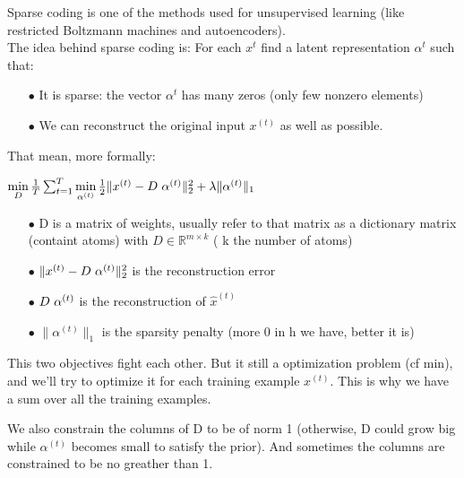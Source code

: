 \documentclass[a4paper,10pt]{article}
\newcommand{\R}{\mathbb{R}}
\begin{document}
Sparse coding is one of the methods used for unsupervised learning  (like restricted Boltzmann machines and autoencoders).\\
The idea behind sparse coding is: For each $x^{t}$ find a latent representation $\alpha^{t}$ such that:
\begin{itemize}
 \item[$\bullet$] It is sparse: the vector $\alpha^{t}$ has many zeros (only few nonzero elements)
 \item[$\bullet$] We can reconstruct the original input $x^{(t)}$ as well as possible.
\end{itemize}
That mean, more formally:\\

\begin{center}
 $\min\limits_{D} \frac{1}{T} \sum_{t=1}^{T}  \min\limits_{\alpha^{(t)}} \frac{1}{2} \| x^{(t)} - D \hspace{3px} \alpha^{(t)} \|_2^2 + \lambda \|\alpha^{(t)} \|_1$\\
\end{center}

 \begin{itemize}
 \item[$\bullet$] D is a matrix of weights, usually refer to that matrix as a dictionary matrix (containt atoms) with $D \in  \R^{m \times k}$ ( k the number of atoms)
  \item[$\bullet$] $\| x^{(t)} - D \hspace{3px} \alpha^{(t)} \|_2^2 $ is the reconstruction error
  \item[$\bullet$]$ D \hspace{3px} \alpha^{(t)}$ is the reconstruction of $\hat{x}^{(t)}$
  \item[$\bullet$]$\|\alpha^{(t)} \|_1$ is the sparsity penalty (more 0 in h we have, better it is)
 \end{itemize}
This two objectives fight each other. But it still a optimization problem (cf min), and we'll try to optimize it for each training example $x^{(t)}$. This is why we have a sum over all the training examples.
\newline

\indent We also constrain the columns of D to be of norm 1 (otherwise, D could grow big while $\alpha^{(t)}$ becomes small to satisfy the prior). And sometimes the columns are constrained to be no greather than 1.\\
\end{document}

